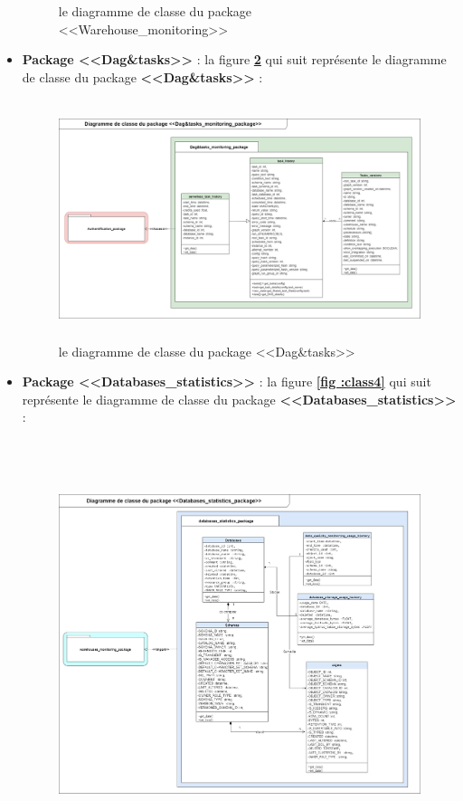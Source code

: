 \begin{itemize}
\begin{figure}[H]
                \caption{le diagramme de classe du package <<Warehouse\_monitoring>>}
                \label{fig :class2}
                \end{figure}
            \newpage
                \item\textbf{Package <<Dag\&tasks>>} : la figure \textbf{\ref{fig :class3}} qui suit représente le diagramme de classe du package \textbf{<<Dag\&tasks>>} : 
            \begin{figure}[H]
                \centering
                \includegraphics[width =0.8\linewidth,height=7cm]{img/conception/class_dag.png}
                \caption{le diagramme de classe du package <<Dag\&tasks>>}
                \label{fig :class3}
                \end{figure}
                \item\textbf{Package <<Databases\_statistics>>} : la figure \textbf{\ref{fig :class4}} qui suit représente le diagramme de classe du package \textbf{<<Databases\_statistics>>} : 
            \begin{figure}[H]
                \centering
                \includegraphics[width =0.8\linewidth,height=12cm]{img/conception/class_database.png}

\end{figure}
\end{itemize}
